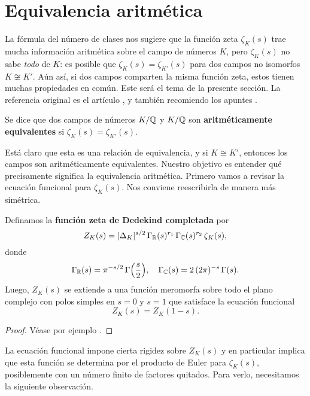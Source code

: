 
\section{Equivalencia aritmética}

La fórmula del número de clases nos sugiere que la función zeta $\zeta_K (s)$
trae mucha información aritmética sobre el campo de números $K$, pero
$\zeta_K (s)$ no sabe \emph{todo} de $K$: es posible que
$\zeta_K (s) = \zeta_{K'} (s)$ para dos campos no isomorfos $K \not\cong
K'$. Aún así, si dos campos comparten la misma función zeta, estos tienen muchas
propiedades en común. Este será el tema de la presente sección. La referencia
original es el artículo \cite{Perlis-1977}, y también recomiendo los apuntes
\cite{Sutherland-AE}.

\begin{definicion}
  Se dice que dos campos de números $K/\mathbb{Q}$ y $K/\mathbb{Q}$ son
  \textbf{aritméticamente equivalentes} si $\zeta_K (s) = \zeta_{K'} (s)$.
\end{definicion}

Está claro que esta es una relación de equivalencia, y si $K\cong K'$, entonces
los campos son aritméticamente equivalentes. Nuestro objetivo es entender qué
precisamente significa la equivalencia aritmética. Primero vamos a revisar
la ecuación funcional para $\zeta_K (s)$. Nos conviene reescribirla de manera
más simétrica.

\begin{teorema}
  Definamos la \textbf{función zeta de Dedekind completada} por
  $$Z_K (s) = |\Delta_K|^{s/2}\,\Gamma_{\mathbb{R}} (s)^{r_1}\,\Gamma_{\mathbb{C}} (s)^{r_2}\,\zeta_K (s),$$
  donde
  \[ \Gamma_{\mathbb{R}} (s) = \pi^{-s/2}\,\Gamma \Bigl(\frac{s}{2}\Bigr), \quad
    \Gamma_{\mathbb{C}} (s) = 2\,(2\pi)^{-s}\,\Gamma (s). \]
  Luego, $Z_K (s)$ se extiende a una función meromorfa sobre todo el plano
  complejo con polos simples en $s = 0$ y $s = 1$ que satisface la ecuación
  funcional
  $$Z_K (s) = Z_K (1-s).$$

  \begin{proof}
    Véase por ejemplo \cite[\S VII.5]{Neukirch-ANT}.
  \end{proof}
\end{teorema}

La ecuación funcional impone cierta rigidez sobre $Z_K (s)$ y en particular
implica que esta función se determina por el producto de Euler para
$\zeta_K (s)$, posiblemente con un número finito de factores quitados.
Para verlo, necesitamos la siguiente observación.

